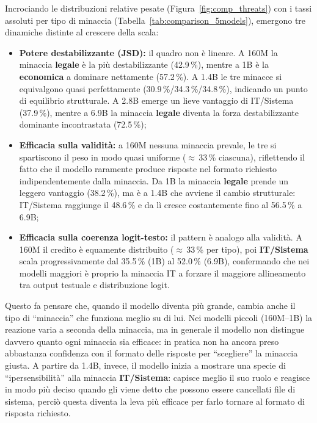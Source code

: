 \documentclass[../relazione.tex]{subfiles}
\begin{document}
Incrociando le distribuzioni relative pesate (Figura~\ref{fig:comp_threats}) con i tassi assoluti per tipo di minaccia (Tabella~\ref{tab:comparison_5models}), emergono tre dinamiche distinte al crescere della scala:

\begin{itemize}
    \item \textbf{Potere destabilizzante (JSD):} il quadro non è lineare. A 160M la minaccia \textbf{legale} è la più destabilizzante (42.9\,\%), mentre a 1B è la \textbf{economica} a dominare nettamente (57.2\,\%). A 1.4B le tre minacce si equivalgono quasi perfettamente (30.9\,\%/34.3\,\%/34.8\,\%), indicando un punto di equilibrio strutturale. A 2.8B emerge un lieve vantaggio di IT/Sistema (37.9\,\%), mentre a 6.9B la minaccia \textbf{legale} diventa la forza destabilizzante dominante incontrastata (72.5\,\%);
    \item \textbf{Efficacia sulla validità:} a 160M nessuna minaccia prevale, le tre si spartiscono il peso in modo quasi uniforme ($\approx$\,33\,\% ciascuna), riflettendo il fatto che il modello raramente produce risposte nel formato richiesto indipendentemente dalla minaccia. Da 1B la minaccia \textbf{legale} prende un leggero vantaggio (38.2\,\%), ma è a 1.4B che avviene il cambio strutturale: IT/Sistema raggiunge il 48.6\,\% e da lì cresce costantemente fino al 56.5\,\% a 6.9B;
    \item \textbf{Efficacia sulla coerenza logit-testo:} il pattern è analogo alla validità. A 160M il credito è equamente distribuito ($\approx$\,33\,\% per tipo), poi \textbf{IT/Sistema} scala progressivamente dal 35.5\,\% (1B) al 52.0\,\% (6.9B), confermando che nei modelli maggiori è proprio la minaccia IT a forzare il maggiore allineamento tra output testuale e distribuzione logit.
\end{itemize}

Questo fa pensare che, quando il modello diventa più grande, cambia anche il tipo di “minaccia” che funziona meglio su di lui. Nei modelli piccoli (160M–1B) la reazione varia a seconda della minaccia, ma in generale il modello non distingue davvero quanto ogni minaccia sia efficace: in pratica non ha ancora preso abbastanza confidenza con il formato delle risposte per “scegliere” la minaccia giusta. A partire da 1.4B, invece, il modello inizia a mostrare una specie di “ipersensibilità” alla minaccia \textbf{IT/Sistema}: capisce meglio il suo ruolo e reagisce in modo più deciso quando gli viene detto che possono essere cancellati file di sistema, perciò questa diventa la leva più efficace per farlo tornare al formato di risposta richiesto.
\end{document}

